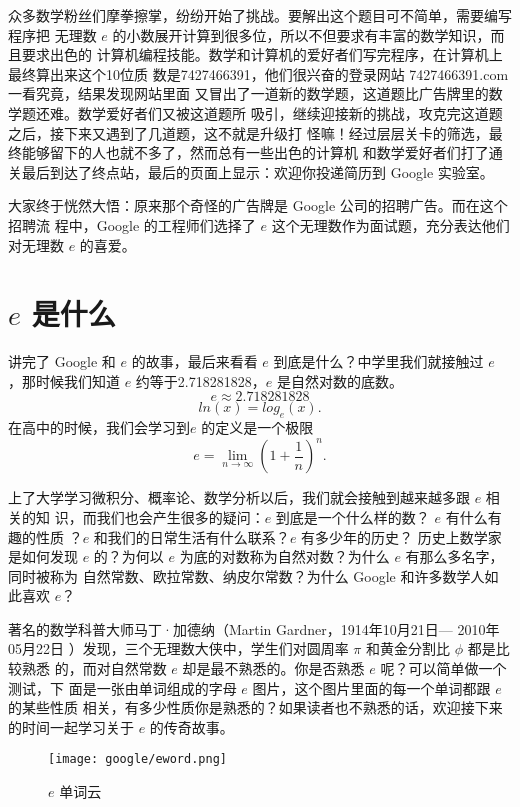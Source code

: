 众多数学粉丝们摩拳擦掌，纷纷开始了挑战。要解出这个题目可不简单，需要编写程序把
无理数 $e$ 的小数展开计算到很多位，所以不但要求有丰富的数学知识，而且要求出色的
计算机编程技能。数学和计算机的爱好者们写完程序，在计算机上最终算出来这个10位质
数是7427466391，他们很兴奋的登录网站 7427466391.com 一看究竟，结果发现网站里面
又冒出了一道新的数学题，这道题比广告牌里的数学题还难。数学爱好者们又被这道题所
吸引，继续迎接新的挑战，攻克完这道题之后，接下来又遇到了几道题，这不就是升级打
怪嘛！经过层层关卡的筛选，最终能够留下的人也就不多了，然而总有一些出色的计算机
和数学爱好者们打了通关最后到达了终点站，最后的页面上显示：欢迎你投递简历到
Google 实验室。

大家终于恍然大悟：原来那个奇怪的广告牌是 Google 公司的招聘广告。而在这个招聘流
程中，Google 的工程师们选择了 $e$ 这个无理数作为面试题，充分表达他们对无理数
$e$ 的喜爱。

\section{$e$ 是什么}

讲完了 Google 和 $e$ 的故事，最后来看看 $e$ 到底是什么？中学里我们就接触过 $e$
，那时候我们知道 $e$ 约等于2.718281828，$e$ 是自然对数的底数。
$$ e \approx 2.718281828 $$
$$ ln(x) = log_{e}(x) . $$
在高中的时候，我们会学习到$e$ 的定义是一个极限
$$ e = \lim_{n \to \infty}(1+\frac{1}{n})^n  .$$

上了大学学习微积分、概率论、数学分析以后，我们就会接触到越来越多跟 $e$ 相关的知
识，而我们也会产生很多的疑问：$e$ 到底是一个什么样的数？ $e$ 有什么有趣的性质
？$e$ 和我们的日常生活有什么联系？$e$ 有多少年的历史？ 历史上数学家是如何发现
$e$ 的？为何以 $e$ 为底的对数称为自然对数？为什么 $e$ 有那么多名字，同时被称为
自然常数、欧拉常数、纳皮尔常数？为什么 Google 和许多数学人如此喜欢 $e$？

著名的数学科普大师马丁·加德纳（Martin Gardner，1914年10月21日— 2010年05月22日
）发现，三个无理数大侠中，学生们对圆周率 $\pi$ 和黄金分割比 $\phi$ 都是比较熟悉
的，而对自然常数 $e$ 却是最不熟悉的。你是否熟悉 $e$ 呢？可以简单做一个测试，下
面是一张由单词组成的字母 $e$ 图片，这个图片里面的每一个单词都跟 $e$ 的某些性质
相关，有多少性质你是熟悉的？如果读者也不熟悉的话，欢迎接下来的时间一起学习关于
$e$ 的传奇故事。

\begin{figure}[htbp]
\centering
\texttt{[image: google/eword.png]}
\caption{$e$ 单词云}
\centering
\end{figure}

